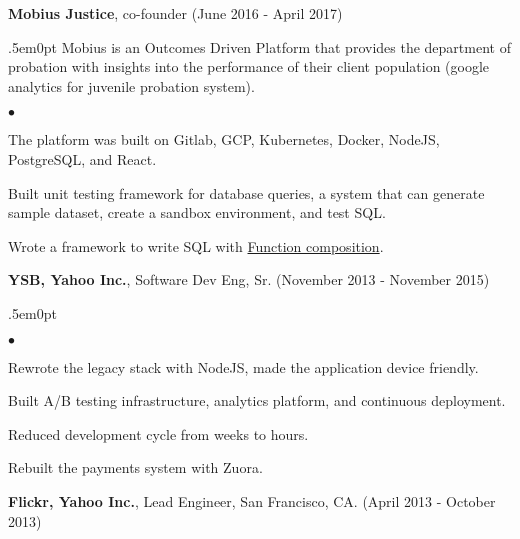\documentclass[margin, line, 10pt]{res}
\newenvironment{list2}{
  \begin{list}{$\bullet$}{%
      \setlength{\itemsep}{0in}
      \setlength{\parsep}{0in} \setlength{\parskip}{0in}
      \setlength{\topsep}{0in} \setlength{\partopsep}{0in}
      \setlength{\leftmargin}{0.2in}}}{\end{list}}
\begin{document}
\begin{resume}
\vspace{.05cm}

{\Large {\bf Mobius Justice}}, co-founder \hfill (June 2016 - April 2017)\\
\begin{adjustwidth}{.5em}{0pt}
  \vspace{-.3cm}
  Mobius is an Outcomes Driven Platform that provides the department of probation with insights
into the performance of their client population (google analytics for juvenile probation system).

  \begin{list2}
  \vspace{.2cm}
  \item The platform was built on Gitlab, GCP, Kubernetes, Docker, NodeJS, PostgreSQL, and React.
  \item Built unit testing framework for database queries, a system that can generate sample dataset, create a sandbox environment, and test SQL.
  \item Wrote a framework to write SQL with \href{https://en.wikipedia.org/wiki/Function_composition_(computer_science)}{Function composition}.
  \end{list2}
  \vspace{.05cm}
\end{adjustwidth}


{\Large {\bf YSB, Yahoo Inc.}}, Software Dev Eng, Sr. \hfill (November 2013 - November 2015)\\
\begin{adjustwidth}{.5em}{0pt}
\vspace{-.3cm}
\begin{list2}
\vspace{.1cm}
\item Rewrote the legacy stack with NodeJS, made the application device friendly.
\item Built A/B testing infrastructure, analytics platform, and continuous deployment.
\item Reduced development cycle from weeks to hours.
\item Rebuilt the payments system with Zuora.
\end{list2}
\vspace{.05cm}
\end{adjustwidth}

{\Large {\bf Flickr, Yahoo Inc.}}, Lead Engineer, San Francisco, CA.  \hfill (April 2013 - October 2013)\\
\vspace{-.3cm}


\end{resume}
\end{document}
